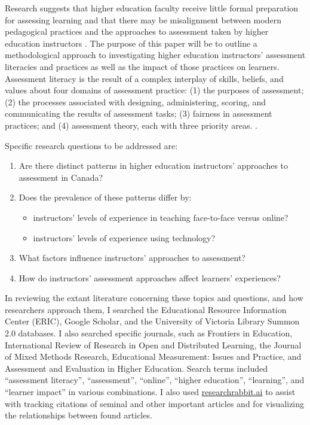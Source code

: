 \documentclass[
]{book}
\providecommand{\tightlist}{%
  \setlength{\itemsep}{0pt}\setlength{\parskip}{0pt}}
\begin{document}
Research suggests that higher education faculty receive little formal preparation for assessing learning \citep{lipnevichWhatGradesMean2020} and that there may be misalignment between modern pedagogical practices and the approaches to assessment taken by higher education instructors \citep{knightSummativeAssessmentHigher2002, masseyAssessmentLiteracyCollege2020, shepardRoleAssessmentLearning2000}. The purpose of this paper will be to outline a methodological approach to investigating higher education instructors' assessment literacies and practices as well as the impact of those practices on learners. Assessment literacy is the result of a complex interplay of skills, beliefs, and values about four domains of assessment practice: (1) the purposes of assessment; (2) the processes associated with designing, administering, scoring, and communicating the results of assessment tasks; (3) fairness in assessment practices; and (4) assessment theory, each with three priority areas. \citep{delucaDifferentialSituatedView2019}.

Specific research questions to be addressed are:

\begin{enumerate}
\def\labelenumi{\arabic{enumi}.}
\tightlist
\item
  Are there distinct patterns in higher education instructors' approaches to assessment in Canada?
\item
  Does the prevalence of these patterns differ by:

  \begin{itemize}
  \tightlist
  \item
    instructors' levels of experience in teaching face-to-face versus online?
  \item
    instructors' levels of experience using technology?
  \end{itemize}
\item
  What factors influence instructors' approaches to assessment?
\item
  How do instructors' assessment approaches affect learners' experiences?
\end{enumerate}

In reviewing the extant literature concerning these topics and questions, and how researchers approach them, I searched the Educational Resource Information Center (ERIC), Google Scholar, and the University of Victoria Library Summon 2.0 databases. I also searched specific journals, such as Frontiers in Education, International Review of Research in Open and Distributed Learning, the Journal of Mixed Methods Research, Educational Measurement: Issues and Practice, and Assessment and Evaluation in Higher Education. Search terms included ``assessment literacy'', ``assessment'', ``online'', ``higher education'', ``learning'', and ``learner impact'' in various combinations. I also used \href{https://researchrabbit.ai}{researchrabbit.ai} to assist with tracking citations of seminal and other important articles and for visualizing the relationships between found articles.
\end{document}
